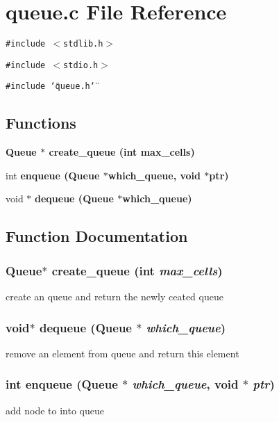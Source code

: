 \section{queue.c File Reference}
\label{queue_8c}
{\tt \#include $<$stdlib.h$>$}\par
{\tt \#include $<$stdio.h$>$}\par
{\tt \#include \char`\"{}queue.h\char`\"{}}\par
\subsection*{Functions}
\begin{CompactItemize}
\item 
\bf{Queue} $\ast$ \bf{create\_\-queue} (int max\_\-cells)
\item 
int \bf{enqueue} (\bf{Queue} $\ast$which\_\-queue, void $\ast$ptr)
\item 
void $\ast$ \bf{dequeue} (\bf{Queue} $\ast$which\_\-queue)
\end{CompactItemize}


\subsection{Function Documentation}
\subsubsection{\setlength{\rightskip}{0pt plus 5cm}\bf{Queue}$\ast$ create\_\-queue (int {\em max\_\-cells})}\label{queue_8c_37f0ebf6bb3301f99bc42638a41ab12e}


create an queue and return the newly ceated queue 
\subsubsection{\setlength{\rightskip}{0pt plus 5cm}void$\ast$ dequeue (\bf{Queue} $\ast$ {\em which\_\-queue})}\label{queue_8c_f8db386ebc4c0620589024d51d83f3b5}


remove an element from queue and return this element 
\subsubsection{\setlength{\rightskip}{0pt plus 5cm}int enqueue (\bf{Queue} $\ast$ {\em which\_\-queue}, void $\ast$ {\em ptr})}\label{queue_8c_b5f34276406bb4ca11d16f5d4c608b33}


add node to into queue 